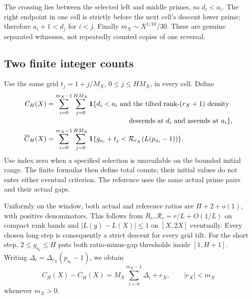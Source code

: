 \documentclass[11pt]{article}
\theoremstyle{definition}
\begin{document}
The crossing lies between the selected left and middle primes,
so $d_i<a_i$. The right endpoint in one cell is strictly before
the next cell's descent lower prime; therefore
$a_i+1<d_j$ for $i<j$. Finally
$m_X\sim X^{1/10}/30$. These are genuine separated witnesses,
not repeatedly counted copies of one reversal.

\subsection{Two finite integer counts}
Use the same grid $t_j=1+j/M_X$, $0\le j\le HM_X$, in every cell.
Define
\begin{align*}
 C_H(X)&=\sum_{i=0}^{m_X-1}\sum_{j=0}^{HM_X}
 {\bf1}\{d_i<a_i\text{ and the tilted rank-$(r_X+1)$ density}\\[-2pt]
 &\hspace{42mm}\text{descends at }d_i\text{ and ascends at }a_i\},\\
 \overline C_H(X)&=\sum_{i=0}^{m_X-1}\sum_{j=0}^{HM_X}
 {\bf1}\{g_{a_i}+t_j<\mathcal R_{r_X}(L(p_{a_i}-1))\}.
\end{align*}
Use index zero when a specified selection is unavailable on the
bounded initial range. The finite formulas then define total counts;
their initial values do not enter either eventual criterion.
The reference uses the same actual prime pairs and their actual gaps.

Uniformly on the window, both actual and reference ratios are
$H+2+o(1)$, with positive denominators. This follows from
$R_r,\mathcal R_r=r/L+O(1/L)$ on compact rank bands and
$|L(y)-L(X)|\le1$ on $[X,2X]$ eventually.
Every chosen long step is consequently a strict descent for every
grid tilt. For the short step, $2\le g_{a_i}\le H$ puts both
ratio-minus-gap thresholds inside $[1,H+1]$.
Writing $\Delta_i=\Delta_{r_X}(p_{a_i}-1)$, we obtain
\begin{equation}\label{eq:count-residual}
 C_H(X)-\overline C_H(X)
 =M_X\sum_{i=0}^{m_X-1}\Delta_i+e_X,\qquad |e_X|<m_X
\end{equation}
whenever $m_X>0$.
\end{document}
